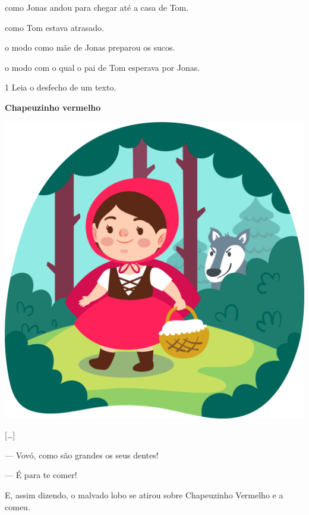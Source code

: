 \begin{escolha}
\item como Jonas andou para chegar até a casa de Tom.

\item como Tom estava atrasado.

\item o modo como mãe de Jonas preparou os sucos.

\item o modo com o qual o pai de Tom esperava por Jonas.
\end{escolha}


\pagebreak
\vspace*{-3.4cm}

\num{1} Leia o desfecho de um texto.

\begin{myquote}
\textbf{Chapeuzinho vermelho}

\begin{center}
\includegraphics[width=.7\textwidth]{./media/image23j.png}
\end{center}

{[}\ldots{}{]}

--- Vovó, como são grandes os seus dentes!

--- É para te comer!

E, assim dizendo, o malvado lobo se atirou sobre Chapeuzinho Vermelho e a
comeu.

\end{myquote}

